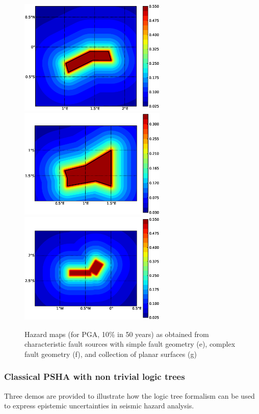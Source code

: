 \begin{figure} 
\centering 
\subcaptionbox{}
{\includegraphics[width=7cm]{./figures/hazard/char_fault2.eps}} 
\subcaptionbox{}
{\includegraphics[width=7cm]{./figures/hazard/char_fault3.eps}} 
\subcaptionbox{}
{\includegraphics[width=7cm]{./figures/hazard/char_fault1.eps}} 
\caption{Hazard maps (for PGA, 10\% in 50 years) as obtained from characteristic fault sources with simple fault
geometry (e), complex fault geometry (f), and collection of planar surfaces (g)}
\label{fig:hazard_maps2}
\end{figure}


\subsubsection{Classical PSHA with non trivial logic trees}
Three demos are provided to illustrate how the logic tree formalism can be used to express epistemic uncertainties in seismic hazard analysis.\\


